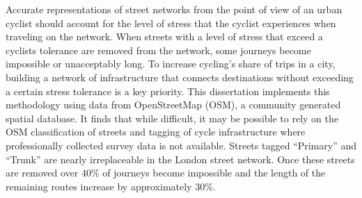 
Accurate representations of street networks from the point of view of an urban cyclist should account for the level of stress that the cyclist experiences when traveling on the network. When streets with a level of stress that exceed a cyclists tolerance are removed from the network, some journeys become impossible or unacceptably long. To increase cycling's share of trips in a city, building a network of infrastructure that connects destinations without exceeding a certain stress tolerance is a key priority. This dissertation implements this methodology using data from OpenStreetMap (OSM), a community generated spatial database. It finds that while difficult, it may be possible to rely on the OSM classification of streets and tagging of cycle infrastructure where professionally collected survey data is not available. Streets tagged ``Primary'' and ``Trunk'' are nearly irreplaceable in the London street network. Once these streets are removed over 40\% of journeys become impossible and the length of the remaining routes increase by approximately 30\%. 